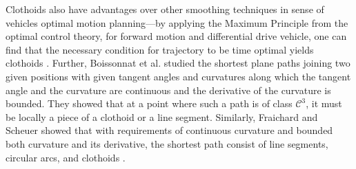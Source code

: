 \documentclass[a4paper,12pt,sort&compress]{article}
\begin{document}
    Clothoids also have advantages over other smoothing techniques in sense of vehicles optimal motion
    planning—by applying the Maximum Principle from the optimal control theory, for forward
    motion and differential drive vehicle, one can find that the necessary condition for
    trajectory to be time optimal yields clothoids \citep*{388788}. Further, Boissonnat  et al.
    \citep*{BOISSONNAT1999613}  studied
    the shortest plane paths joining two given positions with given tangent angles and
    curvatures along which the tangent angle and the curvature are continuous and the derivative
    of the curvature is bounded. They showed that at a point where such a path is of class $\mathcal{C}^3 $,
    it must be locally a piece of a clothoid or a line segment. Similarly, Fraichard and Scheuer
    \citep{1362698} showed that with requirements of continuous curvature and bounded both curvature and its
    derivative, the shortest path consist of line segments, circular arcs, and clothoids \citep*{6646277}.
\end{document}
